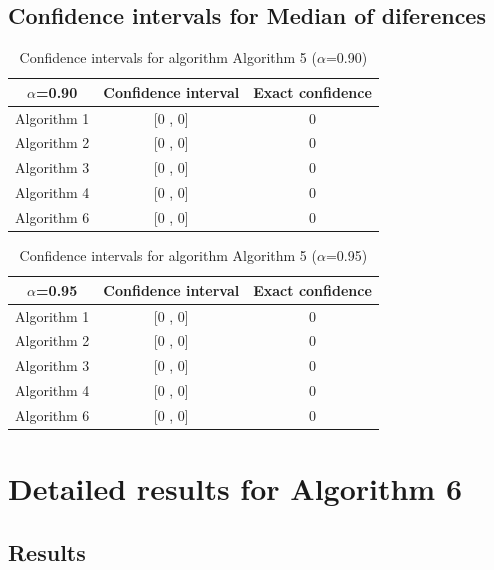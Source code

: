 \documentclass[a4paper,10pt]{article}
\begin{document}
\subsection{Confidence intervals for Median of diferences}

\begin{table}[!htp]
\centering\small
\begin{tabular}{
|c|c|c|}
\hline
 $\alpha$=0.90 & Confidence interval & Exact confidence \\ \hline 
Algorithm 1 & [0 , 0] & 0\\ \hline 
Algorithm 2 & [0 , 0] & 0\\ \hline 
Algorithm 3 & [0 , 0] & 0\\ \hline 
Algorithm 4 & [0 , 0] & 0\\ \hline 
Algorithm 6 & [0 , 0] & 0\\ \hline 

\end{tabular}
\caption{Confidence intervals for algorithm Algorithm 5 ($\alpha$=0.90)}
\end{table}
\begin{table}[!htp]
\centering\small
\begin{tabular}{
|c|c|c|}
\hline
 $\alpha$=0.95 & Confidence interval & Exact confidence \\ \hline 
Algorithm 1 & [0 , 0] & 0\\ \hline 
Algorithm 2 & [0 , 0] & 0\\ \hline 
Algorithm 3 & [0 , 0] & 0\\ \hline 
Algorithm 4 & [0 , 0] & 0\\ \hline 
Algorithm 6 & [0 , 0] & 0\\ \hline 

\end{tabular}
\caption{Confidence intervals for algorithm Algorithm 5 ($\alpha$=0.95)}
\end{table}

 \clearpage 


\section{Detailed results for Algorithm 6}


\subsection{Results}
\end{document}

